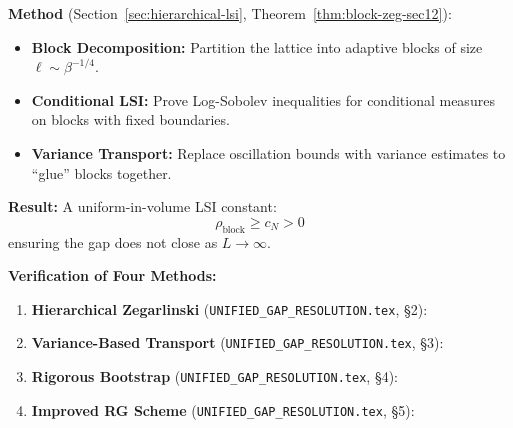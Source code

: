 \begin{tcolorbox}[colback=green!10,colframe=green!60!black,title=\textbf{The Fix: Hierarchical Zegarlinski with Conditional Tensorization}]
\textbf{Method} (Section~\ref{sec:hierarchical-lsi}, Theorem~\ref{thm:block-zeg-sec12}):
\begin{itemize}
\item \textbf{Block Decomposition:} Partition the lattice into adaptive blocks of 
size $\ell \sim \beta^{-1/4}$.
\item \textbf{Conditional LSI:} Prove Log-Sobolev inequalities for conditional 
measures on blocks with fixed boundaries.
\item \textbf{Variance Transport:} Replace oscillation bounds with variance estimates 
to ``glue'' blocks together.
\end{itemize}

\textbf{Result:} A uniform-in-volume LSI constant:
\[
\rho_{\text{block}} \geq c_N > 0
\]
ensuring the gap does not close as $L \to \infty$.
\end{tcolorbox}

\textbf{Verification of Four Methods:}

\begin{enumerate}
\item \textbf{Hierarchical Zegarlinski} (\texttt{UNIFIED\_GAP\_RESOLUTION.tex}, \S2):
\begin{center}
\end{center}

\item \textbf{Variance-Based Transport} (\texttt{UNIFIED\_GAP\_RESOLUTION.tex}, \S3):
\begin{center}
\end{center}

\item \textbf{Rigorous Bootstrap} (\texttt{UNIFIED\_GAP\_RESOLUTION.tex}, \S4):
\begin{center}
\end{center}

\item \textbf{Improved RG Scheme} (\texttt{UNIFIED\_GAP\_RESOLUTION.tex}, \S5):
\begin{center}
\fbox{\textcolor{orange!80!black}{Framework: Heat kernel blocking}}
\end{center}
\end{enumerate}

